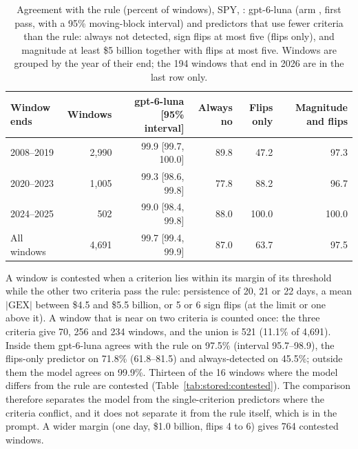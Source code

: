 \begin{table}[H]
\centering
\caption{Agreement with the rule (percent of windows), SPY, : gpt-6-luna (arm , first pass, with a 95\% moving-block interval) and predictors that use fewer criteria than the rule: always not detected, sign flips at most five (flips only), and magnitude at least \$5 billion together with flips at most five. Windows are grouped by the year of their end; the 194 windows that end in 2026 are in the last row only.}
\label{tab:stored:comparators}
\footnotesize
\begin{tabular}{@{}lrrrrr@{}}
\toprule
Window ends & Windows & gpt-6-luna [95\% interval] & Always no & Flips only & Magnitude and flips \\
\midrule
2008--2019 & 2{,}990 & 99.9 [99.7, 100.0] & 89.8 & 47.2 & 97.3 \\
2020--2023 & 1{,}005 & 99.3 [98.6, 99.8] & 77.8 & 88.2 & 96.7 \\
2024--2025 & 502 & 99.0 [98.4, 99.8] & 88.0 & 100.0 & 100.0 \\
All windows & 4{,}691 & 99.7 [99.4, 99.9] & 87.0 & 63.7 & 97.5 \\
\bottomrule
\end{tabular}
\end{table}

A window is contested when a criterion lies within its margin of its threshold while the other two criteria pass the rule: persistence of 20, 21 or 22 days, a mean $|\mathrm{GEX}|$ between \$4.5 and \$5.5 billion, or 5 or 6 sign flips (at the limit or one above it). A window that is near on two criteria is counted once: the three criteria give 70, 256 and 234 windows, and the union is 521 (11.1\% of 4{,}691). Inside them gpt-6-luna agrees with the rule on 97.5\% (interval 95.7--98.9), the flips-only predictor on 71.8\% (61.8--81.5) and always-detected on 45.5\%; outside them the model agrees on 99.9\%. Thirteen of the 16 windows where the model differs from the rule are contested (Table~\ref{tab:stored:contested}). The comparison therefore separates the model from the single-criterion predictors where the criteria conflict, and it does not separate it from the rule itself, which is in the prompt. A wider margin (one day, \$1.0 billion, flips 4 to 6) gives 764 contested windows.

